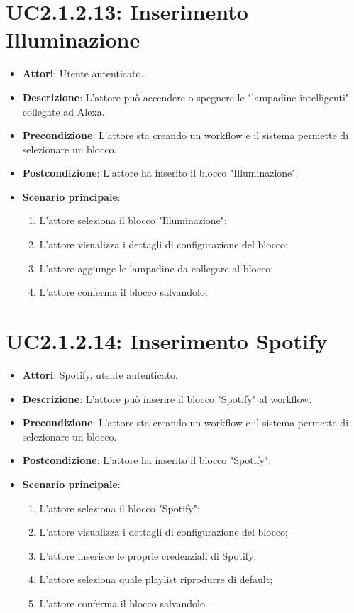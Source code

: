 \section{UC2.1.2.13: Inserimento Illuminazione}
\label{UC2.1.2.13}
\begin{itemize}
	\item \textbf{Attori}: Utente autenticato.
	\item \textbf{Descrizione}: L'attore può accendere o spegnere le "lampadine intelligenti" collegate ad Alexa.
	\item \textbf{Precondizione}: L'attore sta creando un workflow e il sistema permette di selezionare un blocco.
	\item \textbf{Postcondizione}: L'attore ha inserito il blocco "Illuminazione".
	\item \textbf{Scenario principale}:
	\begin{enumerate} \item L'attore seleziona il blocco "Illuminazione"; \item L'attore visualizza i dettagli di configurazione del blocco; \item  L'attore aggiunge le lampadine da collegare al blocco; \item L'attore conferma il blocco salvandolo.\end{enumerate}
\end{itemize}

\section{UC2.1.2.14: Inserimento Spotify}
\label{UC2.1.2.14}
\begin{itemize}
	\item \textbf{Attori}: Spotify, utente autenticato.
	\item \textbf{Descrizione}: L'attore può inserire il blocco "Spotify" al workflow.
	\item \textbf{Precondizione}: L'attore sta creando un workflow e il sistema permette di selezionare un blocco.
	\item \textbf{Postcondizione}: L'attore ha inserito il blocco "Spotify".
	\item \textbf{Scenario principale}:
	\begin{enumerate} \item L'attore seleziona il blocco "Spotify"; \item L'attore visualizza i dettagli di configurazione del blocco; \item  L'attore inserisce le proprie credenziali di Spotify;  \item  L'attore seleziona quale playlist riprodurre di default; \item L'attore conferma il blocco salvandolo.\end{enumerate}
\end{itemize}

